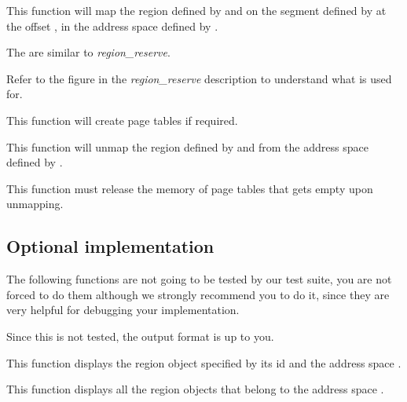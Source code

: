 {
  This function will map the region defined by  and 
  on the segment defined by  at the offset , in the
  address space defined by .
  
  \-

  The  are similar to \emph{region\_reserve}.

  \-

  Refer to the figure in the \emph{region\_reserve} description to understand what
   is used for.

  \-

  This function will create page tables if required.
}

{
  This function will unmap the region defined by  and 
  from the address space defined by .

  \-

  This function must release the memory of page tables that gets empty upon unmapping.
}

\subsection*{Optional implementation}

The following functions are not going to be tested by our test suite, you are
not forced to do them although we strongly recommend you to do it, since they
are very helpful for debugging your implementation.

\-

Since this is not tested, the output format is up to you.

{
  This function displays the region object specified by its id 
  and the address space .
}

{
  This function displays all the region objects that belong to the address
  space .
}

